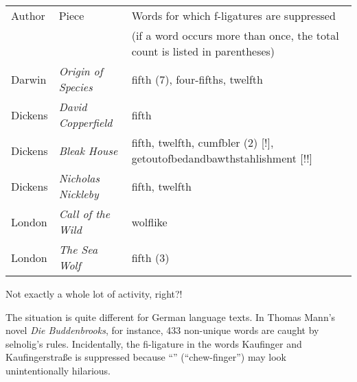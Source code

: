 \documentclass[11pt]{article}
\newcommand{\pkg}[1]{\textsf{#1}}
\begin{document}
{\ebg\RaggedRight 
\smallskip\noindent 
\begin{tabularx}{\textwidth}{@{}llX@{}}
\toprule
Author & Piece & Words for which f-ligatures are suppressed\\
& & (if a word occurs more than once, the total count is listed in parentheses)\\
\midrule
Darwin & \emph{Origin of Species} & fifth (7), four-fifths, twelfth\\
Dickens & \emph{David Copperfield} & fifth \\
Dickens & \emph{Bleak House} & fifth, twelfth, cumfbler (2) [!], getoutofbedandbawthstahlishment [!!]\\
Dickens & \emph{Nicholas Nickleby} & fifth, twelfth\\
London & \emph{Call of the Wild} & wolflike\\
London & \emph{The Sea Wolf} & fifth (3)\\
\bottomrule
\end{tabularx}
}

\enlargethispage{1\baselineskip}

\smallskip
Not exactly a whole lot of activity, right?!


The situation is quite different for German language texts. In Thomas Mann's novel \emph{Die Buddenbrooks}, for instance, 433 non-unique words are caught by \pkg{selnolig}'s rules. Incidentally, the fi-ligature in the words Kaufinger and Kaufingerstraße is suppressed because  \enquote{} (\enquote{chew-finger}) may look unintentionally hilarious.
\end{document}
